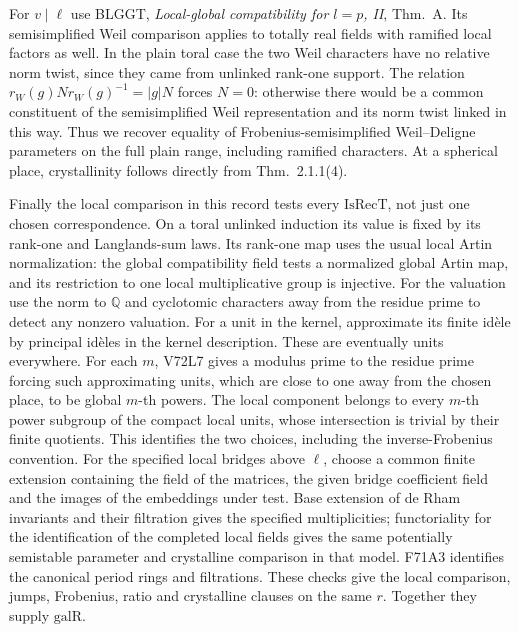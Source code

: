 For $v\mid\ell$ use BLGGT, \emph{Local-global compatibility for
$l=p$, II}, Thm.~A. Its semisimplified Weil comparison applies to
totally real fields with ramified local factors as well. In the
plain toral case the two Weil characters have no relative
norm twist, since they came from unlinked rank-one support.
The relation $r_W(g)Nr_W(g)^{-1}=|g|N$ forces $N=0$: otherwise
there would be a common constituent of the semisimplified
Weil representation and its norm twist linked in this way.
Thus we recover equality of Frobenius-semisimplified
Weil--Deligne parameters on the full plain range, including
ramified characters. At a spherical place, crystallinity follows
directly from Thm.~2.1.1(4).

Finally the local comparison in this record tests every
$\mathrm{IsRecT}$, not just one chosen correspondence. On a toral
unlinked induction its value is fixed by its rank-one and
Langlands-sum laws. Its rank-one map uses the usual local Artin
normalization: the global compatibility field tests a normalized
global Artin map, and its restriction to one local multiplicative
group is injective. For the valuation use the norm to $\mathbb Q$
and cyclotomic characters away from the residue prime to detect
any nonzero valuation. For a unit in the kernel, approximate its
finite idèle by principal idèles in the kernel description. These
are eventually units everywhere. For each $m$, V72L7 gives a modulus
prime to the residue prime forcing such approximating units, which
are close to one away from the chosen place, to be global $m$-th
powers. The local component belongs to every $m$-th power subgroup
of the compact local units, whose intersection is trivial by their
finite quotients. This identifies the
two choices, including the inverse-Frobenius convention.
For the specified local bridges above $\ell$, choose a common finite
extension containing the field of the matrices, the given bridge
coefficient field and the images of the embeddings under test.
Base extension of de Rham invariants and their filtration gives
the specified multiplicities; functoriality for the identification
of the completed local fields gives the same potentially
semistable parameter and crystalline comparison in that model.
F71A3 identifies the canonical period rings and filtrations.
These checks give the local comparison, jumps, Frobenius, ratio
and crystalline clauses on the same $r$. Together they supply
$\mathrm{galR}$.
